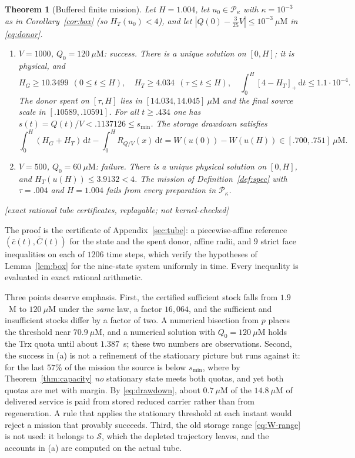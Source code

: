 \documentclass[11pt,a4paper]{article}
\theoremstyle{plain}
\newtheorem{theorem}{Theorem}[section]
\theoremstyle{definition}
\theoremstyle{remark}
\newcommand{\uM}{\ensuremath{\mu\mathrm{M}}}
\newcommand{\dd}{\,\mathrm d}
\newcommand{\HG}{H_G}
\newcommand{\HT}{H_T}
\newcommand{\SSS}{\mathcal S}
\newcommand{\Pp}{\mathcal P}
\newcommand{\pos}[1]{[#1]_+}
\newcommand{\evid}[1]{\textnormal{\textsf{\small[#1]}}}
\begin{document}
\begin{theorem}[Buffered finite mission]\label{thm:tube}
Let $H=1.004$, let $u_0\in\Pp_\kappa$ with $\kappa=10^{-3}$ as in
Corollary~\ref{cor:box} (so $\HT(u_0)<4$), and let
$|Q(0)-\tfrac3{25}V|\le10^{-3}~\uM$ in \eqref{eq:donor}.
\begin{enumerate}[label=(\alph*)]
\item \emph{$V=1000$, $Q_0=120~\uM$: success.} There is a unique solution on
$[0,H]$; it is physical, and
\[
\HG\ge10.3499\ \ (0\le t\le H),\quad \HT\ge4.034\ \ (\tau\le t\le H),\quad
\int_0^H\!\pos{4-\HT}\dd t\le1.1\cdot10^{-4} .
\]
The donor spent on $[\tau,H]$ lies in $[14.034,14.045]~\uM$ and the final
source scale in $[.10589,.10591]$. For all $t\ge.434$ one has
$s(t)=Q(t)/V<.1137126\le s_{\min}$. The storage drawdown satisfies
\begin{equation}\label{eq:drawdown}
\int_0^H(\HG+\HT)\dd t-\int_0^HR_{Q/V}(x)\dd t=W(u(0))-W(u(H))\in[.700,.751]~\uM .
\end{equation}
\item \emph{$V=500$, $Q_0=60~\uM$: failure.} There is a unique physical
solution on $[0,H]$, and $\HT(u(H))\le3.9132<4$. The mission of
Definition~\ref{def:spec} with $\tau=.004$ and $H=1.004$ fails from every
preparation in $\Pp_\kappa$.
\end{enumerate}
\evid{exact rational tube certificates, replayable; not kernel-checked}
\end{theorem}
The proof is the certificate of Appendix~\ref{sec:tube}: a piecewise-affine
reference $(\bar c(t),\bar C(t))$ for the state and the spent donor, affine
radii, and $9$ strict face inequalities on each of $1206$ time steps, which
verify the hypotheses of Lemma~\ref{lem:box} for the nine-state system
uniformly in time. Every inequality is evaluated in exact rational arithmetic.

Three points deserve emphasis. First, the certified sufficient stock falls
from $1.9$~M to $120~\uM$ under the \emph{same} law, a factor $16{,}064$, and
the sufficient and insufficient stocks differ by a factor of two. A numerical
bisection from $p$ places the threshold near $70.9~\uM$, and a numerical
solution with $Q_0=120~\uM$ holds the Trx quota until about $1.387$~s; these
two numbers are observations. Second, the success in (a) is not a refinement of
the stationary picture but runs against it: for the last $57\%$ of the mission
the source is below $s_{\min}$, where by Theorem~\ref{thm:capacity} \emph{no}
stationary state meets both quotas, and yet both quotas are met with margin.
By \eqref{eq:drawdown}, about $0.7~\uM$ of the $14.8~\uM$ of delivered service
is paid from stored reduced carrier rather than from regeneration. A rule that
applies the stationary threshold at each instant would reject a mission that
provably succeeds. Third, the old storage range \eqref{eq:W-range} is not used:
it belongs to $\SSS$, which the depleted trajectory leaves, and the accounts in
(a) are computed on the actual tube.
\end{document}
